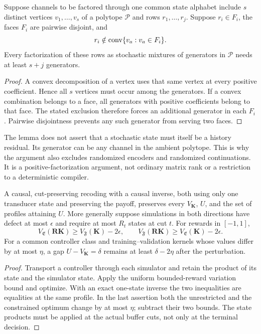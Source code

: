 \begin{lemma}\label{lem:face-packing}
Suppose channels to be factored through one common state alphabet include
$s$ distinct vertices $v_1,\ldots,v_s$ of a polytope $\mathcal P$ and
rows $r_1,\ldots,r_j$. Suppose $r_i\in F_i$, the faces $F_i$ are
pairwise disjoint, and
\[
 r_i\notin\operatorname{conv}\{v_a:v_a\in F_i\}.
\]
Every factorization of these rows as stochastic mixtures of generators
in $\mathcal P$ needs at least $s+j$ generators.
\end{lemma}
\begin{proof}
A convex decomposition of a vertex uses that same vertex at every
positive coefficient. Hence all $s$ vertices must occur among the
generators. If a convex combination belongs to a face, all generators
with positive coefficients belong to that face. The stated exclusion
therefore forces an additional generator in each $F_i$. Pairwise
disjointness prevents any such generator from serving two faces.
\end{proof}

The lemma does not assert that a stochastic state must itself be a
history residual. Its generator can be any channel in the ambient
polytope. This is why the argument also excludes randomized encoders
and randomized continuations. It is a positive-factorization argument,
not ordinary matrix rank or a restriction to a deterministic compiler.

\begin{proposition}
\label{prop:saddle-transport}
A causal, cut-preserving recoding with a causal inverse, both using only
one transducer state and preserving the payoff, preserves every
$V_{\mathbf K}$, $U$, and the set of profiles attaining $U$.
More generally suppose simulations in both directions have defect at
most $\epsilon$ and require at most $R_t$ states at cut $t$. For rewards
in $[-1,1]$,
\[
 V_{\mathfrak E}(\mathbf R\mathbf K)
       \ge V_{\mathfrak F}(\mathbf K)-2\epsilon,\qquad
 V_{\mathfrak F}(\mathbf R\mathbf K)
       \ge V_{\mathfrak E}(\mathbf K)-2\epsilon.
\]
For a common controller class and training--validation kernels whose
values differ by at most $\eta$, a gap $U-V_{\mathbf K}=\delta$
remains at least $\delta-2\eta$ after the perturbation.
\end{proposition}
\begin{proof}
Transport a controller through each simulator and retain the product of
its state and the simulator state. Apply the uniform bounded-reward
variation bound and optimize. With an exact one-state inverse the two
inequalities are equalities at the same profile. In the last assertion
both the unrestricted and the constrained optimum change by at most
$\eta$; subtract their two bounds. The state products must be applied
at the actual buffer cuts, not only at the terminal decision.
\end{proof}

